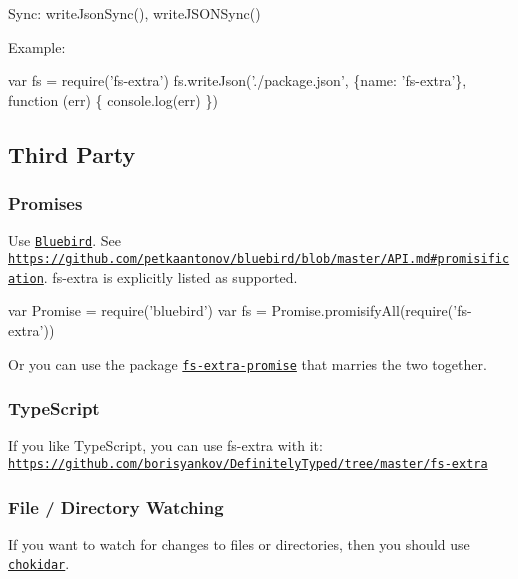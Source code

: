 Sync\+: {\ttfamily write\+Json\+Sync()}, {\ttfamily write\+J\+S\+O\+N\+Sync()}

Example\+:


\begin{DoxyCode}
var fs = require('fs-extra')
fs.writeJson('./package.json', \{name: 'fs-extra'\}, function (err) \{
  console.log(err)
\})
\end{DoxyCode}


\subsection*{Third Party }

\subsubsection*{Promises}

Use \href{https://github.com/petkaantonov/bluebird}{\tt Bluebird}. See \href{https://github.com/petkaantonov/bluebird/blob/master/API.md#promisification}{\tt https\+://github.\+com/petkaantonov/bluebird/blob/master/\+A\+P\+I.\+md\#promisification}. {\ttfamily fs-\/extra} is explicitly listed as supported.


\begin{DoxyCode}
var Promise = require('bluebird')
var fs = Promise.promisifyAll(require('fs-extra'))
\end{DoxyCode}


Or you can use the package \href{https://github.com/overlookmotel/fs-extra-promise}{\tt {\ttfamily fs-\/extra-\/promise}} that marries the two together.

\subsubsection*{Type\+Script}

If you like Type\+Script, you can use {\ttfamily fs-\/extra} with it\+: \href{https://github.com/borisyankov/DefinitelyTyped/tree/master/fs-extra}{\tt https\+://github.\+com/borisyankov/\+Definitely\+Typed/tree/master/fs-\/extra}

\subsubsection*{File / Directory Watching}

If you want to watch for changes to files or directories, then you should use \href{https://github.com/paulmillr/chokidar}{\tt chokidar}.

